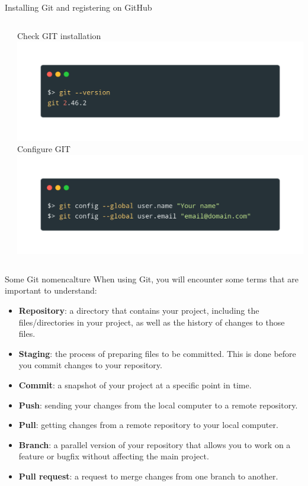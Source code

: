 \documentclass[9pt, aspectratio=169]{beamer}
\begin{document}
\begin{frame}{Installing Git and registering on GitHub}
\begin{columns}[T]
\begin{column}{.4\textwidth}
        \end{column}
        \pause
        \begin{column}{.6\textwidth}
            \centering
            Check GIT installation\\
            \vspace{1em}
            \includegraphics[width=\textwidth]{git_version.png}
            Configure GIT\\
            \includegraphics[width=\textwidth]{git_config.png}
        \end{column}
    \end{columns}
\end{frame}

\begin{frame}
    {Some Git nomencalture}
    When using Git, you will encounter some terms that are important to understand:

    \begin{itemize}
        \item \textbf{Repository}: a directory that contains your project, including the files/directories in your project, as well as the history of changes to those files.
        \pause
        \item \textbf{Staging}: the process of preparing files to be committed. This is done before you commit changes to your repository.
        \item \textbf{Commit}: a snapshot of your project at a specific point in time.
        \item \textbf{Push}: sending your changes from the local computer to a remote repository.
        \item \textbf{Pull}: getting changes from a remote repository to your local computer.
        \pause        
        \item \textbf{Branch}: a parallel version of your repository that allows you to work on a feature or bugfix without affecting the main project.
        \item \textbf{Pull request}: a request to merge changes from one branch to another.
    \end{itemize}

\end{frame}
\end{document}
